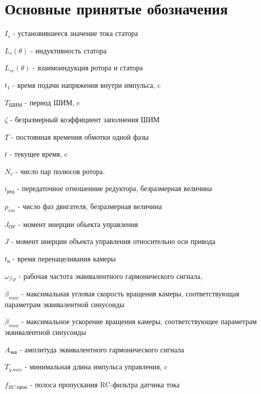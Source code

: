 \section{ Основные принятые обозначения }

$I_{s}$ - установившееся значение тока статора

$L_{s}(\theta)$ - индуктивность статора

$L_{sr}(\theta)$ - взаимоиндукция ротора и статора

$t_{1}$ - время подачи напряжения внутри импульса, c

$T_\text{ШИМ}$ - период ШИМ, c

$\zeta$ - безразмерный коэффициент заполнения ШИМ

$T$ - постоянная времения обмотки одной фазы

$t$ - текущее время, c

$N_{r}$ - число пар полюсов ротора.

$i_\text{ред}$ - передаточное отношениие редуктора, безразмерная величина

$p_{sm}$ - число фаз двигателя, безразмерная величина

$J_{\text{ОУ}}$ - момент инерции объекта управления

$J$ - момент инерции объекта управления относительно оси привода

$t_\text{п}$ - время перенацеливания камеры

$\omega_{\beta.p}$ - рабочая частота эквивалентного гармонического сигнала,

$\dot{\beta}_{max}$ - максимальная угловая скорость вращения камеры, соответствующая параметрам эквивалентной синусоиды

$\ddot{\beta}_{max}$ - максимальное ускорение вращения камеры, соответствующее параметрам эквивалентной синусоиды

$A_\text{экв}$ - амплитуда эквивалентного гармонического сигнала

$T_{y.min}$ - минимальная длина импульса управления, c

$f_{RC.\text{проп} }$ - полоса пропускания RC-фильтра датчика тока
